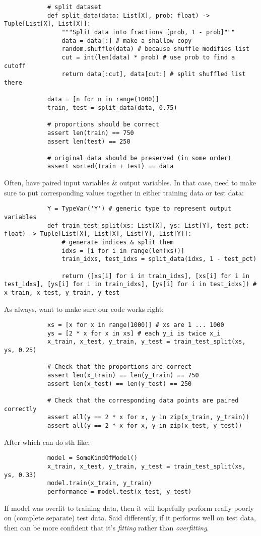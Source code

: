 \documentclass{article}
\begin{document}
\begin{itemize}
\begin{itemize}
\begin{verbatim}
			# split dataset
			def split_data(data: List[X], prob: float) -> Tuple[List[X], List[X]]:
			    """Split data into fractions [prob, 1 - prob]"""
			    data = data[:] # make a shallow copy
			    random.shuffle(data) # because shuffle modifies list
			    cut = int(len(data) * prob) # use prob to find a cutoff
			    return data[:cut], data[cut:] # split shuffled list there
			
			data = [n for n in range(1000)]
			train, test = split_data(data, 0.75)
			
			# proportions should be correct
			assert len(train) == 750
			assert len(test) == 250
			
			# original data should be preserved (in some order)
			assert sorted(train + test) == data
		\end{verbatim}
		Often, have paired input variables \& output variables. In that case, need to make sure to put corresponding values together in either training data or test data:
		\begin{verbatim}
			Y = TypeVar('Y') # generic type to represent output variables
			def train_test_split(xs: List[X], ys: List[Y], test_pct: float) -> Tuple[List[X], List[X], List[Y], List[Y]]:
			    # generate indices & split them
			    idxs = [i for i in range(len(xs))]
		    	train_idxs, test_idxs = split_data(idxs, 1 - test_pct)
			
		    	return ([xs[i] for i in train_idxs], [xs[i] for i in test_idxs], [ys[i] for i in train_idxs], [ys[i] for i in test_idxs]) # x_train, x_test, y_train, y_test
		\end{verbatim}
		As always, want to make sure our code works right:
		\begin{verbatim}
			xs = [x for x in range(1000)] # xs are 1 ... 1000
			ys = [2 * x for x in xs] # each y_i is twice x_i
			x_train, x_test, y_train, y_test = train_test_split(xs, ys, 0.25)
			
			# Check that the proportions are correct
			assert len(x_train) == len(y_train) == 750
			assert len(x_test) == len(y_test) == 250
			
			# Check that the corresponding data points are paired correctly
			assert all(y == 2 * x for x, y in zip(x_train, y_train))
			assert all(y == 2 * x for x, y in zip(x_test, y_test))
		\end{verbatim}
		After which can do sth like:
		\begin{verbatim}
			model = SomeKindOfModel()
			x_train, x_test, y_train, y_test = train_test_split(xs, ys, 0.33)
			model.train(x_train, y_train)
			performance = model.test(x_test, y_test)
		\end{verbatim}
		If model was overfit to training data, then it will hopefully perform really poorly on (complete separate) test data. Said differently, if it performs well on test data, then can be more confident that it's {\it fitting} rather than {\it overfitting}.
		

\end{itemize}
\end{itemize}
\end{document}
